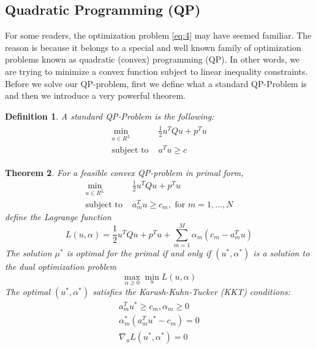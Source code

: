 \documentclass[twoside]{article}
\newcounter{lecnum}
\newtheorem{theorem}{Theorem}[lecnum]
\newtheorem{definition}[theorem]{Definition}
\begin{document}
\subsection{Quadratic Programming (QP)}
For some readers, the optimization problem \ref{eq:4} may have seemed familiar. The reason is because it belongs to a special and well known family of optimization problems known as quadratic (convex) programming (QP). In other words, we are trying to minimize a convex function subject to linear inequality constraints. Before we solve our QP-problem, first we define what a standard QP-Problem is and then we introduce a very powerful theorem.


\begin{definition} \label{def:1}
A standard QP-Problem is the following:
\begin{align*}
\begin{split}
    \min_{u \in R^{L}} &\frac{1}{2}u^{T}Qu + p^{T}u\\
    \text{subject to }
    &a^{T}u \geq c
\end{split}
\end{align*}
\end{definition}

\begin{theorem} \label{theorem:1}
For a feasible convex QP-problem in primal form,
\begin{align*}
    \min_{u\in R^{L}} &\frac{1}{2}u^{T}Qu + p^{T}u\\
    \text{subject to }
    &a_{m}^{T}u \geq c_{m}, \text{ for } m = 1, \dots, N
\end{align*}
define the Lagrange function
\begin{equation*}
    L(u,\alpha) = \frac{1}{2}u^{T}Qu + p^{T}u + \sum_{m=1}^{M}\alpha_{m}(c_m - a_{m}^{T}u) 
\end{equation*}
The solution $\mu^{*}$ is optimal for the primal if and only if $(u^{*},\alpha^{*})$ is a solution to the dual optimization problem
\begin{equation*}
    \max_{\alpha \geq 0}\min_{u}L(u,\alpha)
\end{equation*}
The optimal $(u^{*},\alpha^{*})$ satisfies the Karush-Kuhn-Tucker (KKT) conditions:
\begin{gather}
    a_{m}^{T}u^{*} \geq c_m, \alpha_{m} \geq 0 \label{eq:KKT1}
    \\
    \alpha_{m}^{*}(a_{m}^{T}u^{*} - c_{m}) = 0 \label{eq:KKT2}
    \\
    \nabla_{u}L(u^{*},\alpha^{*}) = 0\label{eq:KKT3}
\end{gather}
\end{theorem}
\end{document}
